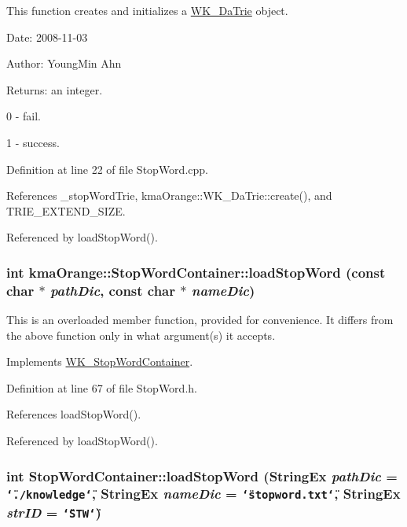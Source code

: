 This function creates and initializes a \hyperlink{classkmaOrange_1_1WK__DaTrie}{WK\_\-DaTrie} object. 

\begin{Desc}
\item[Date:]2008-11-03 \end{Desc}
\begin{Desc}
\item[Author:]YoungMin Ahn \end{Desc}
\begin{Desc}
\item[Returns:]an integer.\par
 0 - fail.\par
 1 - success. \end{Desc}


Definition at line 22 of file StopWord.cpp.

References \_\-stopWordTrie, kmaOrange::WK\_\-DaTrie::create(), and TRIE\_\-EXTEND\_\-SIZE.

Referenced by loadStopWord().\hypertarget{classkmaOrange_1_1StopWordContainer_ab4a54069abd335d64dd34d6f194b1a2}{
\subsubsection[{loadStopWord}]{\setlength{\rightskip}{0pt plus 5cm}int kmaOrange::StopWordContainer::loadStopWord (const char $\ast$ {\em pathDic}, \/  const char $\ast$ {\em nameDic})}}
\label{classkmaOrange_1_1StopWordContainer_ab4a54069abd335d64dd34d6f194b1a2}


This is an overloaded member function, provided for convenience. It differs from the above function only in what argument(s) it accepts. 

Implements \hyperlink{classWK__StopWordContainer_2c85df71a7a6a3b86495aed3d21e26d7}{WK\_\-StopWordContainer}.

Definition at line 67 of file StopWord.h.

References loadStopWord().

Referenced by loadStopWord().\hypertarget{classkmaOrange_1_1StopWordContainer_653df376c7907c3d6e87d77a223cd271}{
\subsubsection[{loadStopWord}]{\setlength{\rightskip}{0pt plus 5cm}int StopWordContainer::loadStopWord ({\bf StringEx} {\em pathDic} = {\tt \char`\"{}./knowledge\char`\"{}}, \/  {\bf StringEx} {\em nameDic} = {\tt \char`\"{}stopword.txt\char`\"{}}, \/  {\bf StringEx} {\em strID} = {\tt \char`\"{}STW\char`\"{}})}}
\label{classkmaOrange_1_1StopWordContainer_653df376c7907c3d6e87d77a223cd271}


